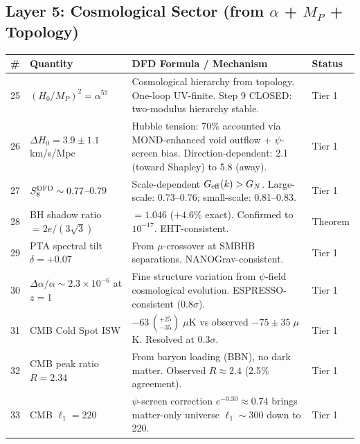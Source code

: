 \documentclass[12pt,a4paper]{article}
\begin{document}
\subsection{Layer 5: Cosmological Sector (from $\alpha$ + $M_P$ + Topology)}

\begin{longtable}{p{0.5cm}p{4cm}p{6.5cm}p{2.5cm}}
\toprule
\# & \textbf{Quantity} & \textbf{DFD Formula / Mechanism} & \textbf{Status} \\
\midrule
\endhead
25 & $(H_0/M_P)^2 = \alpha^{57}$ &
  Cosmological hierarchy from topology.
  One-loop UV-finite.
  Step 9 CLOSED: two-modulus hierarchy stable. &
  Tier 1 \\[4pt]

26 & $\Delta H_0 = 3.9 \pm 1.1$ km/s/Mpc &
  Hubble tension: 70\% accounted via
  MOND-enhanced void outflow + $\psi$-screen bias.
  Direction-dependent: 2.1 (toward Shapley) to
  5.8 (away). &
  Tier 1 \\[4pt]

27 & $S_8^{\rm DFD} \sim 0.77$--$0.79$ &
  Scale-dependent $G_{\rm eff}(k) > G_N$.
  Large-scale: 0.73--0.76; small-scale: 0.81--0.83. &
  Tier 1 \\[4pt]

28 & BH shadow ratio $= 2e/(3\sqrt{3})$ &
  $= 1.046$ ($+4.6\%$ exact).
  Confirmed to $10^{-17}$.  EHT-consistent. &
  Theorem \\[4pt]

29 & PTA spectral tilt $\delta = +0.07$ &
  From $\mu$-crossover at SMBHB separations.
  NANOGrav-consistent. &
  Tier 1 \\[4pt]

30 & $\Delta\alpha/\alpha \sim 2.3 \times 10^{-6}$ at $z=1$ &
  Fine structure variation from $\psi$-field cosmological
  evolution.  ESPRESSO-consistent (0.8$\sigma$). &
  Tier 1 \\[4pt]

31 & CMB Cold Spot ISW &
  $-63\,(^{+25}_{-35})\;\mu$K vs observed
  $-75 \pm 35\;\mu$K.  Resolved at 0.3$\sigma$. &
  Tier 1 \\[4pt]

32 & CMB peak ratio $R = 2.34$ &
  From baryon loading (BBN), no dark matter.
  Observed $R \approx 2.4$ (2.5\% agreement). &
  Tier 1 \\[4pt]

33 & CMB $\ell_1 = 220$ &
  $\psi$-screen correction $e^{-0.30} \approx 0.74$ brings
  matter-only universe $\ell_1 \sim 300$ down to 220. &
  Tier 1 \\[4pt]


\end{longtable}
\end{document}
